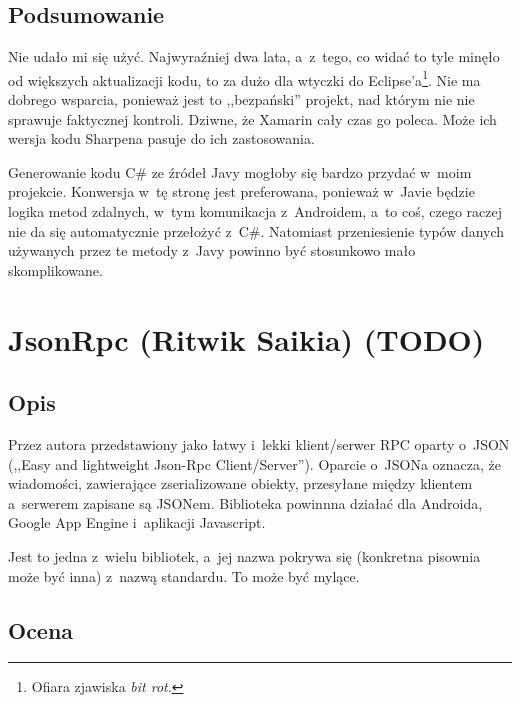 \subsection{Podsumowanie}
Nie udało mi się użyć. Najwyraźniej dwa lata, a~z~tego, co widać to tyle minęło od większych aktualizacji kodu, to za dużo dla wtyczki do Eclipse'a\footnote{Ofiara zjawiska \emph{bit rot}.}.
Nie ma dobrego wsparcia, ponieważ jest to ,,bezpański'' projekt, nad którym nie nie sprawuje faktycznej kontroli.
Dziwne, że Xamarin cały czas go poleca. Może ich wersja kodu Sharpena pasuje do ich zastosowania.

Generowanie kodu C\# ze źródeł Javy mogłoby się bardzo przydać w~moim projekcie. Konwersja w~tę stronę jest preferowana, ponieważ w~Javie będzie logika metod zdalnych, w~tym komunikacja z~Androidem, a~to coś, czego raczej nie da się automatycznie przełożyć z~C\#.
Natomiast przeniesienie typów danych używanych przez te metody z~Javy powinno być stosunkowo mało skomplikowane.



\section{JsonRpc (Ritwik Saikia) (TODO)}
\subsection{Opis}
Przez autora przedstawiony jako łatwy i~lekki klient/serwer RPC oparty o~JSON (,,Easy and lightweight Json-Rpc Client/Server'')\cite{json-rpc-lib}.
Oparcie o~JSONa oznacza, że wiadomości, zawierające zserializowane obiekty, przesyłane między klientem a~serwerem zapisane są JSONem. Biblioteka powinnna działać dla Androida, Google App Engine i~aplikacji Javascript.

Jest to jedna z~wielu bibliotek, a~jej nazwa pokrywa się (konkretna pisownia może być inna) z~nazwą standardu. To może być mylące. 

\subsection{Ocena}

